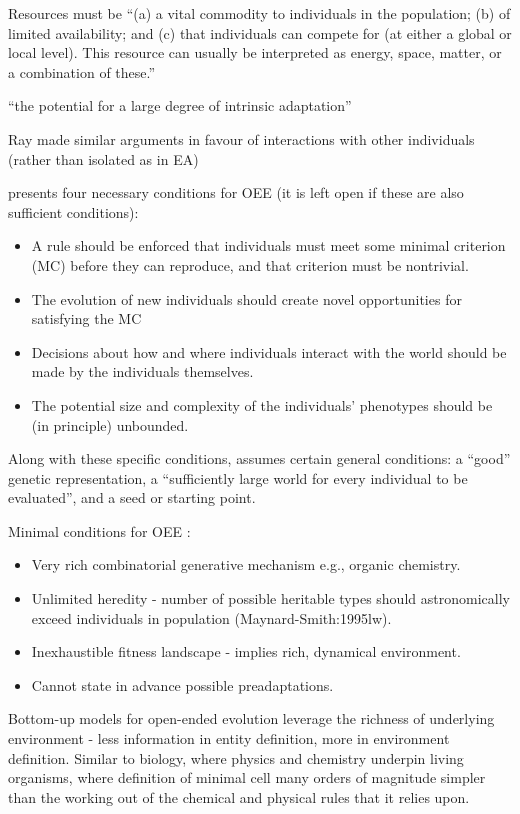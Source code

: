 Resources must be ``(a) a vital commodity to individuals in the population; (b) of limited availability; and (c) that individuals can compete for (at either a global or local level). This resource can usually be interpreted as energy, space, matter, or a combination of these.''

``the potential for a large degree of intrinsic adaptation''

Ray made similar arguments in favour of interactions with other individuals (rather than isolated as in EA) 		

\autocite{Soros2014} presents four necessary conditions for OEE (it is left open if these are also sufficient conditions):
\begin{itemize}
\item A rule should be enforced that individuals must meet some minimal criterion (MC) before they can reproduce, and that criterion must be nontrivial.
\item The evolution of new individuals should create novel opportunities for satisfying the MC
\item Decisions about how and where individuals interact with the world should be made by the individuals themselves.
\item The potential size and complexity of the individuals' phenotypes should be (in principle) unbounded.
\end{itemize}
Along with these specific conditions, \autocite{Soros2014} assumes certain general conditions: a ``good'' genetic representation, a ``sufficiently large world for every individual to be evaluated'', and a seed or starting point.

Minimal conditions for OEE \autocite{Vasas2015}:
\begin{itemize}
\item
Very rich combinatorial generative mechanism e.g., organic chemistry.
\item
Unlimited heredity - number of possible heritable types should astronomically exceed individuals in population (Maynard-Smith:1995lw).
\item
Inexhaustible fitness landscape - implies rich, dynamical environment.
\item
Cannot state in advance possible preadaptations.
\end{itemize}

Bottom-up models for open-ended evolution leverage the richness of underlying environment - less information in entity definition, more in environment definition. Similar to biology, where physics and chemistry underpin living organisms, where definition of minimal cell many orders of magnitude simpler than the working out of the chemical and physical rules that it relies upon.

